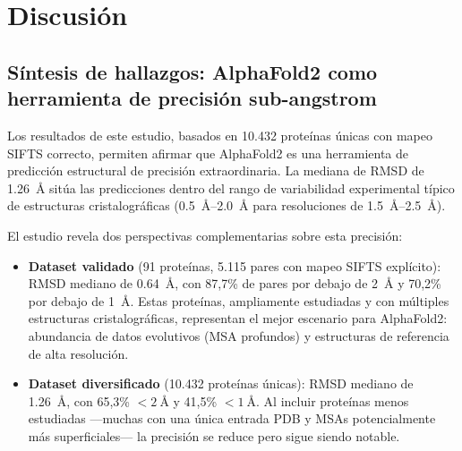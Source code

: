 
\section{Discusi\'on}
\label{sec:discusion}

\subsection{S\'intesis de hallazgos: AlphaFold2 como herramienta de precisi\'on sub-angstrom}
\label{subsec:sintesis_hallazgos}

Los resultados de este estudio, basados en 10.432 prote\'inas \'unicas con mapeo SIFTS
correcto, permiten afirmar que AlphaFold2 es una herramienta de predicci\'on estructural
de precisi\'on extraordinaria. La mediana de RMSD de \SI{1,26}{\angstrom} sit\'ua las
predicciones dentro del rango de variabilidad experimental t\'ipico de estructuras
cristalogr\'aficas (\SIrange{0,5}{2,0}{\angstrom} para resoluciones de \SIrange{1,5}{2,5}{\angstrom}).

El estudio revela dos perspectivas complementarias sobre esta precisi\'on:

\begin{itemize}
    \item \textbf{Dataset validado} (91 prote\'inas, 5.115 pares con mapeo SIFTS expl\'icito):
    RMSD mediano de \SI{0,64}{\angstrom}, con 87,7\% de pares por debajo de \SI{2}{\angstrom}
    y 70,2\% por debajo de \SI{1}{\angstrom}. Estas prote\'inas, ampliamente estudiadas y con
    m\'ultiples estructuras cristalogr\'aficas, representan el mejor escenario para AlphaFold2:
    abundancia de datos evolutivos (MSA profundos) y estructuras de referencia de alta
    resoluci\'on.

    \item \textbf{Dataset diversificado} (10.432 prote\'inas \'unicas): RMSD mediano de
    \SI{1,26}{\angstrom}, con 65,3\% $< \SI{2}{\angstrom}$ y 41,5\% $< \SI{1}{\angstrom}$.
    Al incluir prote\'inas menos estudiadas ---muchas con una \'unica entrada PDB y MSAs
    potencialmente m\'as superficiales--- la precisi\'on se reduce pero sigue siendo notable.
\end{itemize}

